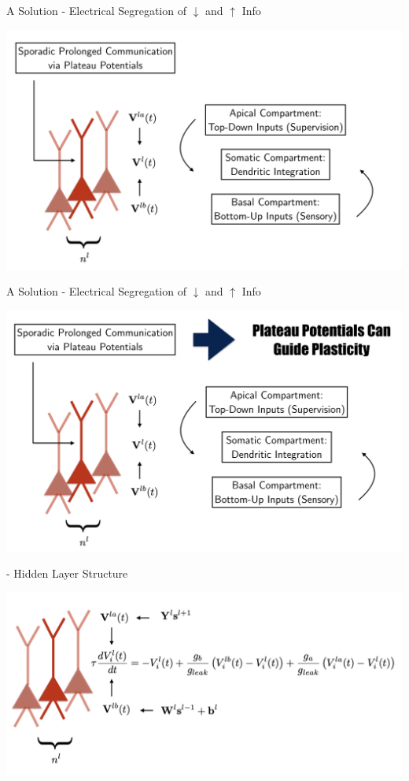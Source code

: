 \documentclass[dvipsnames, usenames]{beamer}
\begin{document}
\begin{frame}[noframenumbering]{A Solution - Electrical Segregation of $\downarrow$ and $\uparrow$ Info}

\centering 
\includegraphics[width=1.1\textwidth]{../figures/report/comp_sol_2}
\end{frame}
\begin{frame}[noframenumbering]{A Solution - Electrical Segregation of $\downarrow$ and $\uparrow$ Info}

\centering 
\includegraphics[width=1.1\textwidth]{../figures/report/comp_sol_3}
\end{frame}

\begin{frame}{\citet{guerguiev2017} - Hidden Layer Structure}

\centering 
\includegraphics[width=1.1\textwidth]{../figures/report/hidden_1}
\end{frame}
\end{document}
